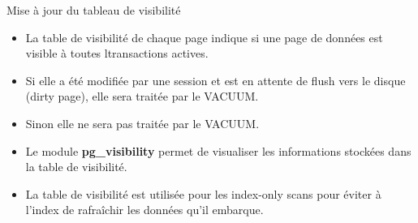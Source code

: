 \begin{frame}{Mise à jour du tableau de visibilité}

\begin{itemize}
   \item La table de visibilité de chaque page indique si une page de données est visible à toutes ltransactions actives.
   \item Si elle a été modifiée par une session et est en attente de flush vers le disque (dirty page), elle sera traitée par le VACUUM.
   \item Sinon elle ne sera pas traitée par le VACUUM.
   \item Le module \textbf{pg\_visibility} permet de visualiser les informations stockées dans la table de visibilité.
   \item La table de visibilité est utilisée pour les index-only scans pour éviter à l'index de rafraîchir les données qu'il embarque.
\end{itemize}

\begin{toile}
\end{toile}
   
\end{frame}


